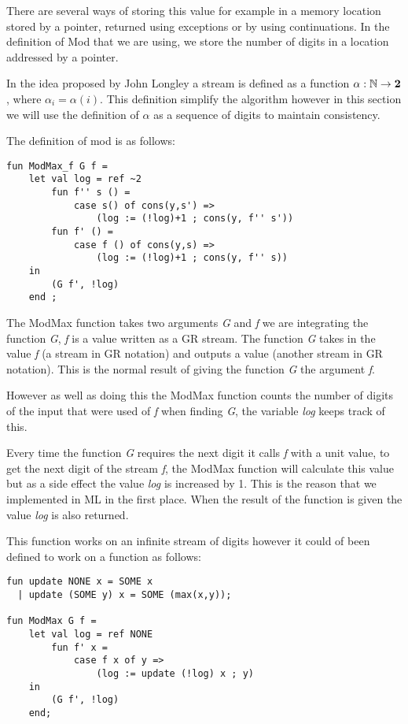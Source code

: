 \documentclass{cs4rep}
\begin{document}
There are several ways of storing this value for example in a memory
location stored by a pointer, returned using exceptions or by using
continuations. In the definition of Mod that we are using, we store
the number of digits in a location addressed by a pointer.

In the idea proposed by John Longley a stream is defined as a function
$\alpha: \mathbb{N} \rightarrow {\bf 2}$, where $\alpha_{i} = \alpha(i)$. This
definition simplify the algorithm however in this section we will use
the definition of $\alpha$ as a sequence of digits to maintain
consistency.

The definition of mod is as follows:
\begin{verbatim}
fun ModMax_f G f =
    let val log = ref ~2
        fun f'' s () = 
            case s() of cons(y,s') =>
                (log := (!log)+1 ; cons(y, f'' s'))
        fun f' () =
            case f () of cons(y,s) =>
                (log := (!log)+1 ; cons(y, f'' s))
    in
        (G f', !log)
    end ;
\end{verbatim}

The ModMax function takes two arguments {\em G} and {\em f} we are
integrating the function {\em G}, {\em f} is a value written as a GR
stream. The function {\em G} takes in the value {\em f} (a stream in
GR notation) and outputs a value (another stream in GR notation). This
is the normal result of giving the function {\em G} the argument {\em
  f}.

However as well as doing this the ModMax function counts the number of
digits of the input that were used of {\em f} when finding {\em G},
the variable {\em log} keeps track of this.  

Every time the function {\em G} requires the next digit it calls {\em
  f} with a unit value, to get the next digit of the stream {\em f},
the ModMax function will calculate this value but as a side effect the
value {\em log} is increased by 1.  This is the reason that we
implemented in ML in the first place. When the result of the
function is given the value {\em log} is also returned.


This function works on an infinite stream of digits however it could
of been defined to work on a function as follows:

\begin{verbatim}
fun update NONE x = SOME x
  | update (SOME y) x = SOME (max(x,y));

fun ModMax G f =
    let val log = ref NONE
        fun f' x =
            case f x of y =>
                (log := update (!log) x ; y)
    in
        (G f', !log)
    end;
\end{verbatim}
\end{document}

